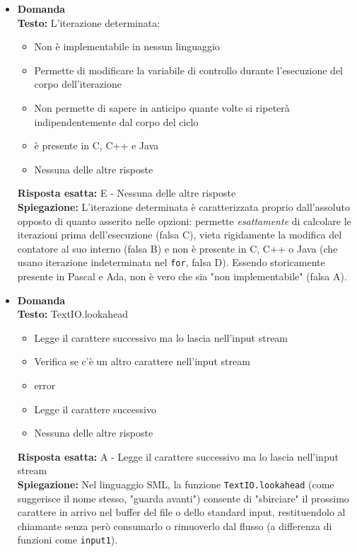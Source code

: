 \documentclass[12pt, a4paper]{article}
\newcounter{domandateoria}
\begin{document}
\begin{itemize}
    \item {}\textbf{Domanda \thedomandateoria} \\
    \textbf{Testo:} L'iterazione determinata:
    \begin{itemize}
        \item[A)] Non è implementabile in nessun linguaggio
        \item[B)] Permette di modificare la variabile di controllo durante l'esecuzione del corpo dell'iterazione
        \item[C)] Non permette di sapere in anticipo quante volte si ripeterà indipendentemente dal corpo del ciclo
        \item[D)] è presente in C, C++ e Java
        \item[E)] Nessuna delle altre risposte
    \end{itemize}
    \textbf{Risposta esatta:} E - Nessuna delle altre risposte \\
    \textbf{Spiegazione:} L'iterazione determinata è caratterizzata proprio dall'assoluto opposto di quanto asserito nelle opzioni: permette \textit{esattamente} di calcolare le iterazioni prima dell'esecuzione (falsa C), vieta rigidamente la modifica del contatore al suo interno (falsa B) e non è presente in C, C++ o Java (che usano iterazione indeterminata nel \texttt{for}, falsa D). Essendo storicamente presente in Pascal e Ada, non è vero che sia "non implementabile" (falsa A).
    \vspace{0.3cm}

    \item {}\textbf{Domanda \thedomandateoria} \\
    \textbf{Testo:} TextIO.lookahead
    \begin{itemize}
        \item[A)] Legge il carattere successivo ma lo lascia nell'input stream
        \item[B)] Verifica se c'è un altro carattere nell'input stream
        \item[C)] error
        \item[D)] Legge il carattere successivo
        \item[E)] Nessuna delle altre risposte
    \end{itemize}
    \textbf{Risposta esatta:} A - Legge il carattere successivo ma lo lascia nell'input stream \\
    \textbf{Spiegazione:} Nel linguaggio SML, la funzione \texttt{TextIO.lookahead} (come suggerisce il nome stesso, "guarda avanti") consente di "sbirciare" il prossimo carattere in arrivo nel buffer del file o dello standard input, restituendolo al chiamante senza però consumarlo o rimuoverlo dal flusso (a differenza di funzioni come \texttt{input1}).
    \vspace{0.3cm}


\end{itemize}
\end{document}
